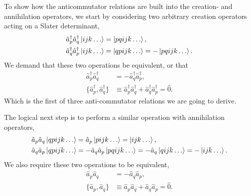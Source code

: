     To show how the anticommutator relations are built into the creation- and annihilation 
    operators, we start by considering two arbitrary creation operators acting on a Slater determinant,
    \begin{equation}
        \begin{aligned}
            \hat{a}_p^\dagger \hat{a}_q^\dagger \ket{ijk \dots} &= \ket{pqijk \dots}, \\
            \hat{a}_q^\dagger \hat{a}_p^\dagger \ket{ijk \dots} &= \ket{qpijk \dots}
                = - \ket{pqijk \dots}.
        \end{aligned}
    \end{equation}
    We demand that these two operations be equivalent, or that 
    \begin{equation}
        \begin{aligned}
            \hat{a}_p^\dagger \hat{a}_q^\dagger &= 
                -\hat{a}_q^\dagger \hat{a}_p^\dagger, \\
            \{\hat{a}_p^\dagger, \hat{a}_q^\dagger\} &\equiv 
                \hat{a}_p^\dagger \hat{a}_q^\dagger + 
                \hat{a}_q^\dagger \hat{a}_p^\dagger = \hat{0}.
        \end{aligned}
    \end{equation}
    Which is the first of three anti-commutator relations we are going to derive.

    The logical next step is to perform a similar operation with annihilation 
    operators,
    \begin{equation}
        \begin{aligned}
            \hat{a}_p \hat{a}_q \ket{qpijk \dots} &= 
                \hat{a}_p\ket{pijk \dots} = \ket{ijk \dots}, \\
            \hat{a}_q \hat{a}_p \ket{qpijk \dots} &= 
                - \hat{a}_q \hat{a}_p \ket{pqijk \dots} = 
                - \hat{a}_q \ket{qijk \dots} = - \ket{ijk \dots}.
        \end{aligned}
    \end{equation}
    We also require these two operations to be equivalent, 
    \begin{equation}
        \begin{aligned}
            \hat{a}_p \hat{a}_q &= 
                -\hat{a}_q \hat{a}_p, \\
            \{\hat{a}_p, \hat{a}_q\} &\equiv 
                \hat{a}_p \hat{a}_q + 
                \hat{a}_q \hat{a}_p = \hat{0}.
        \end{aligned}
    \end{equation}

